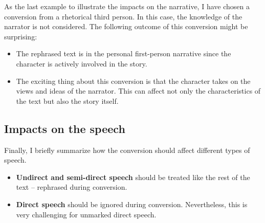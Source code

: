 As the last example to illustrate the impacts on the narrative, I have chosen a conversion from a rhetorical third person. In this case, the knowledge of the narrator is not considered. The following outcome of this conversion might be surprising:

\begin{itemize}
	\item The rephrased text is in the personal first-person narrative since the character is actively involved in the story.
	\item The exciting thing about this conversion is that the character takes on the views and ideas of the narrator. This can affect not only the characteristics of the text but also the story itself.
\end{itemize}


\subsection*{Impacts on the speech}

Finally, I briefly summarize how the conversion should affect different types of speech.

\begin{itemize}
	\item \textbf{Undirect and semi-direct speech} should be treated like the rest of the text -- rephrased during conversion.
	\item \textbf{Direct speech} should be ignored during conversion. Nevertheless, this is very challenging for unmarked direct speech.
\end{itemize}


